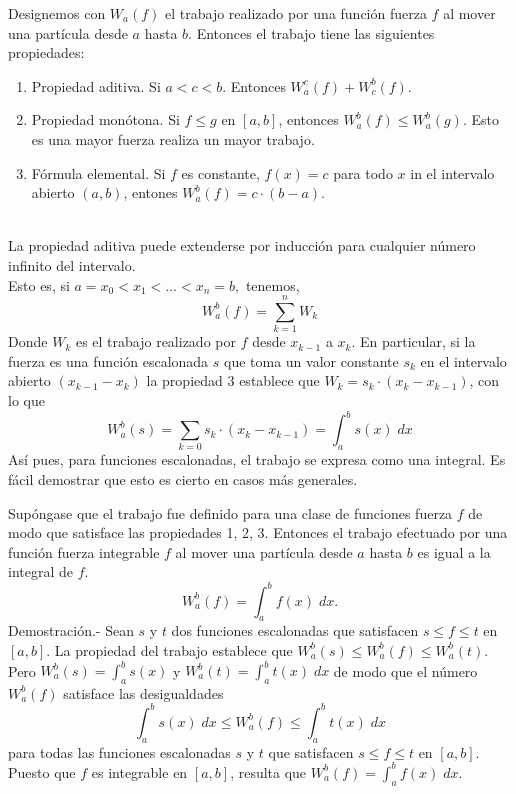     \begin{prop}
	Designemos con $W_a(f)$ el trabajo realizado por una función fuerza $f$ al mover una partícula desde $a$ hasta $b$. Entonces el trabajo tiene las siguientes propiedades:
	\begin{enumerate}[\bfseries 1.]

	    \item Propiedad aditiva. Si $a<c<b$. Entonces $W_a^c(f) + W_c^b(f)$.

	    \item Propiedad monótona. Si $f\leq g$ en $[a,b]$, entonces $W_a^b (f) \leq W_a^b(g)$. Esto es una mayor fuerza realiza un mayor trabajo.

	    \item Fórmula elemental. Si $f$ es constante, $f(x)=c$ para todo $x$ in el intervalo abierto $(a,b)$, entones $W_a^b(f) = c \cdot (b-a)$.\\\\

	\end{enumerate}

	La propiedad aditiva puede extenderse por inducción para cualquier número infinito del intervalo.\\
	Esto es, si $a=x_0<x_1<\ldots<x_n = b,$ tenemos,
	$$W_a^b(f) = \sum\limits_{k=1}^n W_k$$
	Donde $W_k$  es el trabajo realizado por $f$ desde $x_{k-1}$ a $x_k$. En particular, si la fuerza es una función escalonada $s$ que toma un valor constante $s_k$ en el intervalo abierto $(x_{k-1}-x_k)$ la propiedad 3 establece que $W_k = s_k\cdot (x_k-x_{k-1})$, con lo que 
	$$W_a^b (s) = \sum_{k=0} s_k \cdot (x_k-x_{k-1}) = \int_a^b s(x)\; dx$$
	Así pues, para funciones escalonadas, el trabajo se expresa como una integral. Es fácil demostrar que esto es cierto en casos más generales.
    \end{prop}

\begin{teo}
    Supóngase que el trabajo fue definido para una clase de funciones fuerza $f$ de modo que satisface las propiedades 1, 2, 3. Entonces el trabajo efectuado por una función fuerza integrable $f$ al mover una partícula desde $a$ hasta $b$ es igual a la integral de $f$.
    $$W_a^b (f) = \int_a^b f(x)\; dx.$$
    Demostración.-\; Sean $s$ y $t$ dos funciones escalonadas que satisfacen $s\leq f\leq t$ en $[a,b]$. La propiedad del trabajo establece que $W_a^b (s) \leq W_a^b(f) \leq W_a^b (t)$. Pero $W_a^b (s) = \int_a^b s(x)$ y $W_a^b (t) = \int_a^b t(x) \;dx $ de modo que el número $W_a^b (f)$ satisface las desigualdades
    $$\int_a^b s(x)\; dx \leq W_a^b (f) \leq \int_a^b t(x)\; dx$$
    para todas las funciones escalonadas $s$ y $t$ que satisfacen $s\leq f\leq t$ en $[a,b]$. Puesto que $f$ es integrable en $[a,b]$, resulta que $W_a^b (f) = \int_a^b f(x)\; dx.$
\end{teo}


